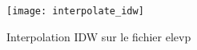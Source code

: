 \begin{figure}[ht]
   \begin{center}
   \caption{Interpolation IDW sur le fichier elevp \nixcaption}\label{fig:interpolation_idw}\smallskip
   \texttt{[image: interpolate\_idw]}
\end{center}  
\end{figure}

\newpage
